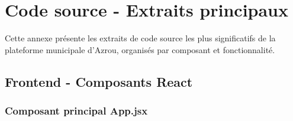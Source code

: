 \chapter{Code source - Extraits principaux}

Cette annexe présente les extraits de code source les plus significatifs de la plateforme municipale d'Azrou, organisés par composant et fonctionnalité.

\section{Frontend - Composants React}

\subsection{Composant principal App.jsx}


